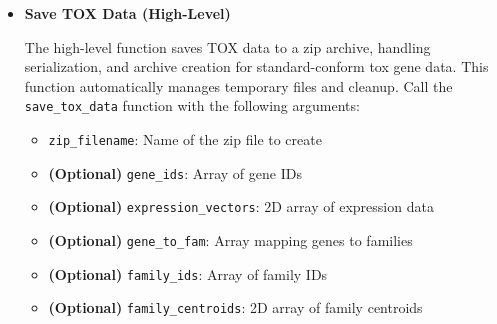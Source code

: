 \documentclass[11pt]{article}
\begin{document}
\begin{enumerate}
\begin{itemize}
	      	      \begin{itemize}
	      	      	\item \texttt{zip\_filename}: Path to the zip file to extract
	      	      \end{itemize}
	      	      
	      	      \textbf{Returns:}
	      	      \begin{itemize}
	      	      	\item Dictionary mapping data keys to extracted temporary filenames
	      	      \end{itemize}
	      	      
	      	      \begin{lstlisting}[language=Python, caption={Python Extract Zip Archive}]
extract_zip_archive(zip_filename)
	      	      \end{lstlisting}
	      	      
	      	\item \textbf{Save TOX Data (High-Level)}
	      	      
	      	      The high-level function saves TOX data to a zip archive, handling
	      	      serialization, and archive creation for standard-conform tox gene data.
	      	      This function automatically manages temporary files and cleanup. Call the
	      	      \texttt{save\_tox\_data} function with the following arguments:
	      	      
	      	      \begin{itemize}
	      	      	\item \texttt{zip\_filename}: Name of the zip file to create
	      	      	      
	      	      	\item \textbf{(Optional)} \texttt{gene\_ids}: Array of gene IDs
	      	      	      
	      	      	\item \textbf{(Optional)} \texttt{expression\_vectors}: 2D array of
	      	      	      expression data
	      	      	      
	      	      	\item \textbf{(Optional)} \texttt{gene\_to\_fam}: Array mapping
	      	      	      genes to families
	      	      	      
	      	      	\item \textbf{(Optional)} \texttt{family\_ids}: Array of family IDs
	      	      	      
	      	      	\item \textbf{(Optional)} \texttt{family\_centroids}: 2D array of
	      	      	      family centroids
	      	      	      

\end{itemize}
\end{itemize}
\end{enumerate}
\end{document}
